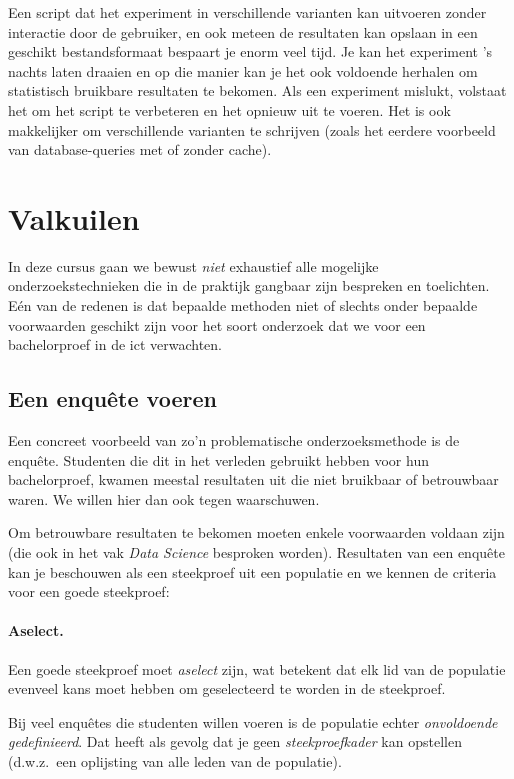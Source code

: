 Een script dat het experiment in verschillende varianten kan uitvoeren zonder interactie door de gebruiker, en ook meteen de resultaten kan opslaan in een geschikt bestandsformaat bespaart je enorm veel tijd. Je kan het experiment 's nachts laten draaien en op die manier kan je het ook voldoende herhalen om statistisch bruikbare resultaten te bekomen. Als een experiment mislukt, volstaat het om het script te verbeteren en het opnieuw uit te voeren. Het is ook makkelijker om verschillende varianten te schrijven (zoals het eerdere voorbeeld van database-queries met of zonder cache).

\section{Valkuilen}%
\label{sec:methodologie-valkuilen}

In deze cursus gaan we bewust \emph{niet} exhaustief alle mogelijke onderzoekstechnieken die in de praktijk gangbaar zijn bespreken en toelichten. Eén van de redenen is dat bepaalde methoden niet of slechts onder bepaalde voorwaarden geschikt zijn voor het soort onderzoek dat we voor een bachelorproef in de ict verwachten.

\subsection{Een enquête voeren}%
\label{ssec:enquete}

Een concreet voorbeeld van zo'n problematische onderzoeksmethode is de en\-quê\-te. Studenten die dit in het verleden gebruikt hebben voor hun bachelorproef, kwamen meestal resultaten uit die niet bruikbaar of betrouwbaar waren. We willen hier dan ook tegen waarschuwen.

Om betrouwbare resultaten te bekomen moeten enkele voorwaarden voldaan zijn (die ook in het vak \emph{Data Science} besproken worden). Resultaten van een enquête kan je beschouwen als een steekproef uit een populatie en we kennen de criteria voor een goede steekproef:

\paragraph{Aselect.}

Een goede steekproef moet \emph{aselect} zijn, wat betekent dat elk lid van de populatie evenveel kans moet hebben om geselecteerd te worden in de steekproef.

Bij veel enquêtes die studenten willen voeren is de populatie echter \emph{onvoldoende gedefinieerd}. Dat heeft als gevolg dat je geen \emph{steekproefkader} kan opstellen (d.w.z.\ een oplijsting van alle leden van de populatie).

